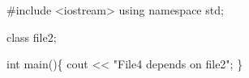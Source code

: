 
\begin{DoxyCode}
#include <iostream>
using namespace std;


class file2;

int main()\{
    cout << "File4 depends on file2";
\}
\end{DoxyCode}
 
